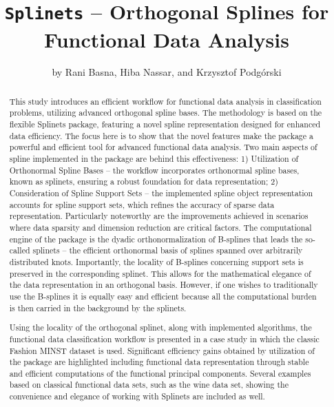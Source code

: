\title{{\tt Splinets} -- Orthogonal Splines for Functional Data Analysis}
\author{by Rani Basna, Hiba Nassar, and Krzysztof Podg\'{o}rski}

\maketitle

\begin{abstract}
This study introduces an efficient workflow for functional data analysis in classification problems, utilizing advanced orthogonal spline bases.
The methodology is based on the flexible Splinets package, featuring a novel spline representation designed for enhanced data efficiency. 
The focus here is to show that the novel features make the package a powerful and efficient tool for advanced functional data analysis. 
Two main aspects of spline implemented in the package are behind this effectiveness: 1) Utilization of Orthonormal Spline Bases -- the workflow incorporates orthonormal spline bases, known as splinets, ensuring a robust foundation for data representation; 2) Consideration of Spline Support Sets -- the implemented spline object representation accounts for spline support sets, which refines the accuracy of sparse data representation.
Particularly noteworthy are the improvements achieved in scenarios where data sparsity and dimension reduction are critical factors.
The computational engine of the package is the dyadic orthonormalization of B-splines that leads the so-called splinets -- the efficient orthonormal basis of splines spanned over arbitrarily distributed knots.
Importantly, the locality of B-splines concerning support sets is preserved in the corresponding splinet. 
This allows for the mathematical elegance of the data representation in an orthogonal basis. However, if one wishes to traditionally use the B-splines it is equally easy and efficient because all the computational burden is then carried in the background by the splinets. 
  

Using the locality of the orthogonal splinet, along with implemented algorithms, the functional data classification workflow is presented in a case study in which the classic Fashion MINST dataset is used.
Significant efficiency gains obtained by utilization of the package are highlighted including functional data representation through stable and efficient computations of the functional principal components. Several examples based on classical functional data sets, such as the wine data set,  showing the convenience and elegance of working with Splinets are included as well. 
\end{abstract}    

